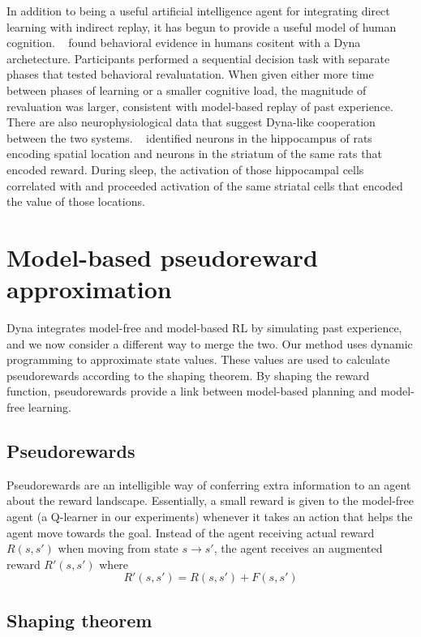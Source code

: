 \documentclass[letterpaper]{article}
\begin{document}
In addition to being a useful artificial intelligence agent for integrating direct learning with indirect replay, it has begun to provide a useful model of human cognition. ~\cite{gershman2014retrospective} found behavioral evidence in humans cositent with a Dyna archetecture.  Participants performed a sequential decision task with separate phases that tested behavioral revaluatation. When given either more time between phases of learning or a smaller cognitive load, the magnitude of revaluation was larger, consistent with model-based replay of past experience. There are also neurophysiological data that suggest Dyna-like cooperation between the two systems. ~\cite{lansink2009hippocampus} identified neurons in the hippocampus of rats encoding spatial location and neurons in the striatum of the same rats that encoded reward. During sleep, the activation of those hippocampal cells correlated with and proceeded activation of the same striatal cells that encoded the value of those locations.

\section{Model-based pseudoreward approximation}

Dyna integrates model-free and model-based RL by simulating past experience, and we now consider a different way to merge the two. Our method uses dynamic programming to approximate state values. These values are used to calculate pseudorewards according to the shaping theorem. By shaping the reward function, pseudorewards provide a link between model-based planning and model-free learning.

\subsection{Pseudorewards}

Pseudorewards are an intelligible way of conferring extra information to an agent about the reward landscape. Essentially, a small reward is given to the model-free agent (a Q-learner in our experiments) whenever it takes an action that helps the agent move towards the goal. Instead of the agent receiving actual reward $R(s, s')$ when moving from state $s \rightarrow s'$, the agent receives an augmented reward $R'(s, s')$ where
\begin{equation}
R'(s, s') = R(s, s') + F(s, s')
\end{equation} 

\subsection{Shaping theorem}
\end{document}
